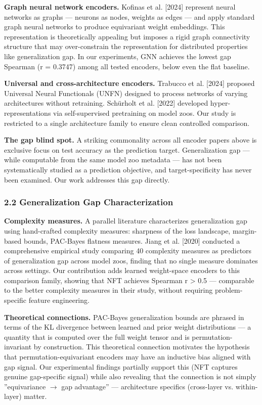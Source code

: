 \textbf{Graph neural network encoders.} Kofinas et al. [2024] represent neural networks as graphs --- neurons
as nodes, weights as edges --- and apply standard graph neural networks to produce equivariant weight
embeddings. This representation is theoretically appealing but imposes a rigid graph connectivity
structure that may over-constrain the representation for distributed properties like generalization gap.
In our experiments, GNN achieves the lowest gap Spearman (r = 0.3747) among all tested encoders,
below even the flat baseline.

\textbf{Universal and cross-architecture encoders.} Trabucco et al. [2024] proposed Universal Neural
Functionals (UNFN) designed to process networks of varying architectures without retraining. Schürholt
et al. [2022] developed hyper-representations via self-supervised pretraining on model zoos. Our study
is restricted to a single architecture family to ensure clean controlled comparison.

\textbf{The gap blind spot.} A striking commonality across all encoder papers above is exclusive focus on
test accuracy as the prediction target. Generalization gap --- while computable from the same model zoo
metadata --- has not been systematically studied as a prediction objective, and target-specificity
has never been examined. Our work addresses this gap directly.

\subsubsection{2.2 Generalization Gap Characterization}

\textbf{Complexity measures.} A parallel literature characterizes generalization gap using hand-crafted
complexity measures: sharpness of the loss landscape, margin-based bounds, PAC-Bayes flatness measures.
Jiang et al. [2020] conducted a comprehensive empirical study comparing 40 complexity measures as
predictors of generalization gap across model zoos, finding that no single measure dominates across
settings. Our contribution adds learned weight-space encoders to this comparison family, showing that
NFT achieves Spearman r > 0.5 --- comparable to the better complexity measures in their study, without
requiring problem-specific feature engineering.

\textbf{Theoretical connections.} PAC-Bayes generalization bounds are phrased in terms of the KL divergence
between learned and prior weight distributions --- a quantity that is computed over the full weight tensor
and is permutation-invariant by construction. This theoretical connection motivates the hypothesis that
permutation-equivariant encoders may have an inductive bias aligned with gap signal. Our experimental
findings partially support this (NFT captures genuine gap-specific signal) while also revealing that the
connection is not simply ''equivariance $\rightarrow$ gap advantage'' --- architecture specifics (cross-layer vs.
within-layer) matter.

